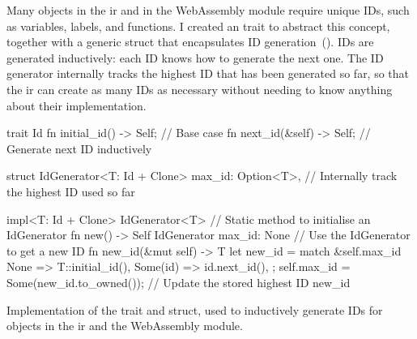 \documentclass[../00-main.tex]{subfiles}
\begin{document}
Many objects in the \gls{ir} and in the WebAssembly module require unique IDs, such as variables, labels, and functions.
I created an  trait to abstract this concept, together with a generic  struct that encapsulates ID generation~().
IDs are generated inductively: each ID knows how to generate the next one.
The ID generator internally tracks the highest ID that has been generated so far, so that the \gls{ir} can create as many IDs as necessary without needing to know anything about their implementation.

\begin{listing}[t]
  \begin{RustListing}
    trait Id {
        fn initial_id() -> Self;   // Base case
        fn next_id(&self) -> Self; // Generate next ID inductively
    }

    struct IdGenerator<T: Id + Clone> {
        max_id: Option<T>,         // Internally track the highest ID used so far
    }

    impl<T: Id + Clone> IdGenerator<T> {
        // Static method to initialise an IdGenerator
        fn new() -> Self {
            IdGenerator { max_id: None }
        }
        // Use the IdGenerator to get a new ID
        fn new_id(&mut self) -> T {
            let new_id = match &self.max_id {
                None => T::initial_id(),
                Some(id) => id.next_id(),
            };
            self.max_id = Some(new_id.to_owned()); // Update the stored highest ID
            new_id
        }
    }
  \end{RustListing}
  \caption{Implementation of the  trait and  struct, used to inductively generate IDs for objects in the \acrlong{ir} and the WebAssembly module.}
  \label{lst:Id and IdGenerator implementation}
\end{listing}
\end{document}
